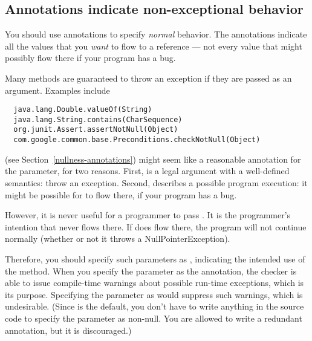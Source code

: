 \subsection{Annotations indicate non-exceptional behavior\label{annotate-normal-behavior}}

You should use annotations to specify \emph{normal} behavior.  The
annotations indicate all the values that you \emph{want} to flow to a
reference --- not every value that might possibly flow there if your
program has a bug.

Many methods are guaranteed to throw an exception if they are passed 
as an argument.  Examples include

\begin{Verbatim}
  java.lang.Double.valueOf(String)
  java.lang.String.contains(CharSequence)
  org.junit.Assert.assertNotNull(Object)
  com.google.common.base.Preconditions.checkNotNull(Object)
\end{Verbatim}

 (see Section~\ref{nullness-annotations})
might seem like a reasonable annotation for the parameter,
for two reasons.  First,  is a legal argument with a
well-defined semantics:  throw an exception.  Second, 
describes a possible program execution:  it might be possible for
 to flow there, if your program has a bug.


However, it is never useful for a programmer to pass .  It is
the programmer's intention that  never flows there.  If
 does flow there, the program will not continue normally
(whether or not it throws a NullPointerException).

Therefore, you should specify such parameters as
, indicating
the intended use of the method.  When you specify the parameter as the 
annotation, the checker is able to issue compile-time warnings about
possible run-time exceptions, which is its purpose.  Specifying the parameter
as  would suppress such warnings, which is undesirable.
(Since  is the default, you don't have to write anything in
the source code to specify the parameter as non-null.  You are allowed to
write a redundant  annotation, but it is discouraged.)

